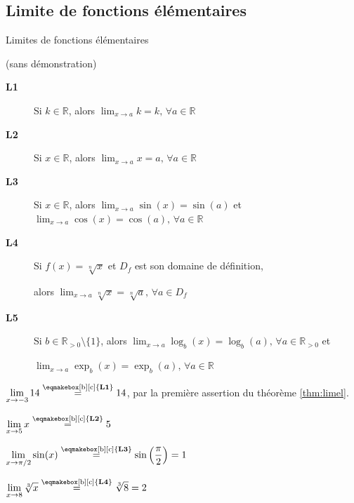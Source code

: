 \documentclass[a4paper,12pt]{article}
\begin{document}
\subsection{Limite de fonctions élémentaires}
\label{sec:limel}
\begin{thm}[label=thm:limel]
Limites de fonctions élémentaires

(sans démonstration)
	\tcblower
	\noindent\begin{description}
		\item[{\bfseries L1}] Si $k\in\mathbb{R}$, alors $\displaystyle{\lim_{x\rightarrow a}k=k}, \,\forall a\in\mathbb{R}$
		\item[{\bfseries L2}] Si $x\in \mathbb{R}$, alors $\displaystyle{\lim_{x\rightarrow a}x=a}, \,\forall a\in \mathbb{R}$
		\item[{\bfseries L3}] Si $x\in \mathbb{R}$, alors $\displaystyle{\lim_{x\rightarrow a}\sin(x)=\sin(a)}$ et $\displaystyle{\lim_{x\rightarrow a}\cos(x)=\cos(a)},\, \forall a\in \mathbb{R}$
		\item[{\bfseries L4}] Si $f(x)=\sqrt[n]{x}$ et $D_f$ est son domaine de définition, 

			alors $\displaystyle{\lim_{x\rightarrow a}\sqrt[n]{x}=\sqrt[n]{a}}, \, \forall a \in D_f$ 
		\item[{\bfseries L5}] Si $b\in \mathbb{R}_{>0}\setminus\{1\}$, alors $\displaystyle{\lim_{x\rightarrow a}\log_b(x)=\log_b(a)}, \,\forall a\in \mathbb{R}_{>0}$ et 

			$\displaystyle{\lim_{x\rightarrow a}\exp_b(x)=\exp_b(a)},\,\forall a\in \mathbb{R}$  	
	\end{description}
\end{thm}
\begin{exemple}
	\tcblower
	$\displaystyle{\lim_{x\rightarrow -3}14\stackrel{\text{\eqmakebox[b][c]{{\bfseries L1}}}}{=}14}$, par la première assertion du théorème \ref{thm:limel}. 
\end{exemple}

\begin{exemple}
	\tcblower
$\displaystyle{\lim_{x\rightarrow 5}x\stackrel{\text{\eqmakebox[b][c]{{\bfseries L2}}}}{=}5}$ 
\end{exemple}

\begin{exemple}
	\tcblower
	$\displaystyle{\lim_{x\rightarrow \pi/2}\sin(x)\stackrel{\text{\eqmakebox[b][c]{{\bfseries L3}}}}{=}\sin\left(\dfrac{\pi}{2}\right)}=1$ 
\end{exemple}
\begin{exemple}
	\tcblower
	$\displaystyle{\lim_{x\rightarrow 8}\sqrt[3]{x}\stackrel{\text{\eqmakebox[b][c]{{\bfseries L4}}}}{=}\sqrt[3]{8}=2}$ 
\end{exemple}
\end{document}
